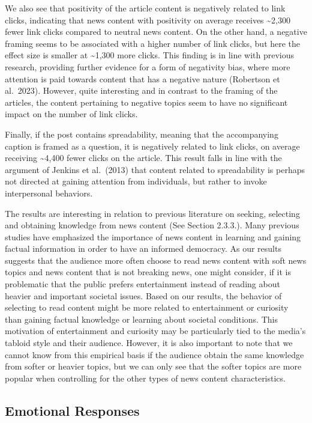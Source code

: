 \documentclass[
]{article}
\begin{document}
We also see that positivity of the article content is negatively related
to link clicks, indicating that news content with positivity on average
receives \textasciitilde2,300 fewer link clicks compared to neutral news
content. On the other hand, a negative framing seems to be associated
with a higher number of link clicks, but here the effect size is smaller
at \textasciitilde1,300 more clicks. This finding is in line with
previous research, providing further evidence for a form of negativity
bias, where more attention is paid towards content that has a negative
nature (Robertson et al.~2023). However, quite interesting and in
contrast to the framing of the articles, the content pertaining to
negative topics seem to have no significant impact on the number of link
clicks.

Finally, if the post contains spreadability, meaning that the
accompanying caption is framed as a question, it is negatively related
to link clicks, on average receiving \textasciitilde4,400 fewer clicks
on the article. This result falls in line with the argument of Jenkins
et al.~(2013) that content related to spreadability is perhaps not
directed at gaining attention from individuals, but rather to invoke
interpersonal behaviors.

The results are interesting in relation to previous literature on
seeking, selecting and obtaining knowledge from news content (See
Section 2.3.3.). Many previous studies have emphasized the importance of
news content in learning and gaining factual information in order to
have an informed democracy. As our results suggests that the audience
more often choose to read news content with soft news topics and news
content that is not breaking news, one might consider, if it is
problematic that the public prefers entertainment instead of reading
about heavier and important societal issues. Based on our results, the
behavior of selecting to read content might be more related to
entertainment or curiosity than gaining factual knowledge or learning
about societal conditions. This motivation of entertainment and
curiosity may be particularly tied to the media's tabloid style and
their audience. However, it is also important to note that we cannot
know from this empirical basis if the audience obtain the same knowledge
from softer or heavier topics, but we can only see that the softer
topics are more popular when controlling for the other types of news
content characteristics.

\hypertarget{emotional-responses-2}{%
\subsection{Emotional Responses}\label{emotional-responses-2}}
\end{document}
